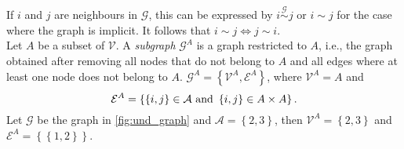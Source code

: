 \documentclass[12pt]{book}
\begin{document}
If $i$ and $j$ are neighbours in $\mathcal{G}$, this can be expressed by $i\overset{\mathcal{G}}{\sim}j$ or $i\sim j$ for the case where the graph is implicit. It follows that $i\sim j\Longleftrightarrow j\sim i$. \\
Let $A$ be a subset of $\mathcal{V}$. A \textit{subgraph} $\mathcal{G}^A$ is a graph restricted to $A$, i.e., the graph obtained after removing all nodes that do not belong to $A$ and all edges where at least one node does not belong to $A$. $\mathcal{G}^A=\left\lbrace\mathcal{V}^A,\mathcal{E}^A\right\rbrace$, where $\mathcal{V}^A=A$ and 
\begin{equation*}
    \mathcal{E}^A = \left\lbrace\left\lbrace i,j\right\rbrace\in\mathcal{A} \hbox{ and } \left\lbrace i,j\right\rbrace\in A\times A\right\rbrace.
\end{equation*}
Let $\mathcal{G}$ be the graph in \autoref{fig:und_graph} and $\mathcal{A}=\left\lbrace2,3\right\rbrace$, then $\mathcal{V}^A=\left\lbrace2,3\right\rbrace$ and $\mathcal{E}^A=\left\lbrace\left\lbrace 1,2\right\rbrace\right\rbrace$\autocite[Cf.][]{rue2005gaussian}.
\end{document}

